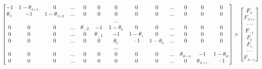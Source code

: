 \begin{equation}
\setcounter{MaxMatrixCols}{20}
\begin{bmatrix}
     -1      & 1-\theta_{_{S+1}} & 0                 & ...  & 0            & 0            & 0             & 0             & 0             & ... & 0               & 0  & 0 \\
\theta_{_S}  & -1                & 1-\theta_{_{S+2}} & ...  & 0            & 0            & 0             & 0             & 0             & ... & 0               & 0  & 0 \\
             &                   &                   &      &              &              & ...           &               &               &     &                 &    &   \\
 0           & 0                 & 0                 & ...  & \theta_{_-2} & -1           & 1-\theta_{_0} & 0             & 0             & ... & 0               & 0  & 0 \\
 0           & 0                 & 0                 & ...  & 0            & \theta_{_-1} & -1            & 1-\theta_{_1} & 0             & ... & 0               & 0  & 0 \\
 0           & 0                 & 0                 & ...  & 0            & 0            & \theta_{_0}   & -1            & 1-\theta_{_2} & ... & 0               & 0  & 0 \\
             &                   &                   &      &              &              & ...           &               &               &     &                 &    &   \\
 0           & 0                 & 0                 & ...  & 0            & 0            & 0             & 0             & 0             & ... & \theta_{_{E-2}} & -1 & 1-\theta_{_E} \\
 0           & 0                 & 0                 & ...  & 0            & 0            & 0             & 0             & 0             & ... & 0               & \theta_{_{E-1}} & -1
 \end{bmatrix}
 \times
 \begin{bmatrix}
     F_{_{S}}   \\
     F_{_{S+1}} \\
     \cdots     \\
     F_{_{-1}}  \\
     F_{_{0} }  \\
     F_{_{1} }  \\
     \cdots     \\
     F_{_{E-1}} \\

\end{bmatrix}
\end{equation}
